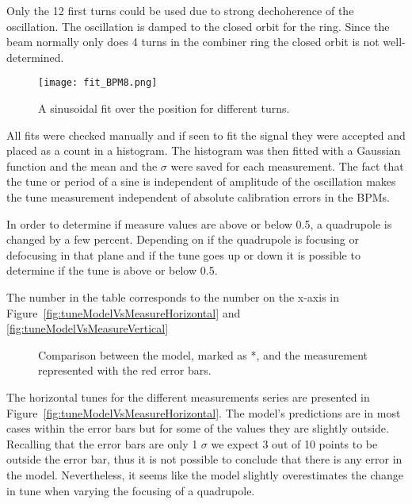 Only the 12 first turns could be used due to strong dechoherence 
of the oscillation. The oscillation is damped to the closed orbit for the ring. 
Since the beam normally only does 4 turns in the combiner ring 
the closed orbit is not well-determined. 
\begin{figure}[!h]
\centering
\texttt{[image: fit\_BPM8.png]}
\caption{A sinusoidal fit over the position for different turns. \label{fig:fitOfPosition}}
\end{figure}
All fits were checked manually and if seen to fit the signal they were accepted and
placed as a count in a histogram. 
The histogram was then fitted with a Gaussian function and the mean and 
the $\sigma$ were saved for each measurement.
The fact that the tune or period of a sine is 
independent of amplitude of the oscillation makes the tune measurement 
independent of absolute calibration errors in the BPMs.
 
In order to determine if measure values are above or below 0.5, 
a quadrupole is changed by a few percent. 
Depending on if the quadrupole is focusing or 
defocusing in that plane and if the tune goes up or down it is possible to 
determine if the tune is above or below 0.5.  

The number in the table corresponds to the number on the x-axis in 
Figure~\ref{fig:tuneModelVsMeasureHorizontal} and \ref{fig:tuneModelVsMeasureVertical}

\begin{figure}[!h]
\centering
{}
\caption[Example tune measu
Comparison between the tune from the model and the measurement]
{Comparison between the model, marked as *, and the measurement represented with the red error bars. 
}
\end{figure}
 
The horizontal tunes for the different measurements series are presented in 
Figure~\ref{fig:tuneModelVsMeasureHorizontal}. 
The model's predictions are in most cases within the error bars 
but for some of the values they are slightly outside. 
Recalling that the error bars are only 1 $\sigma$ we expect 
3 out of 10 points to be outside the error bar, 
thus it is not possible to conclude that there is any error in the model. 
Nevertheless, it seems like the model slightly overestimates 
the change in tune when varying the focusing of a quadrupole.



